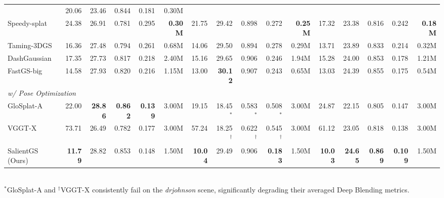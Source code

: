 \documentclass[sigconf]{acmart}
\begin{document}
\begin{table}[t!]
\begin{tabular} {l | rrrrr | rrrrr | rrrrr}
            & 20.06 & 23.46 & 0.844 & 0.181 & \cellcolor{tabsecond}0.30M \\
        Speedy-splat~\cite{hanson2025speedy}
            & 24.38 & 26.91 & 0.781 & 0.295 & \cellcolor{tabfirst} \bf 0.30M
            & 21.75 & 29.42 & 0.898 & 0.272 & \cellcolor{tabfirst} \bf 0.25M
            & 17.32 & 23.38 & 0.816 & 0.242 & \cellcolor{tabfirst} \bf 0.18M \\
        Taming-3DGS~\cite{mallick2024taming}
            & \cellcolor{tabthird}16.36 & 27.48 & 0.794 & 0.261 & \cellcolor{tabthird}0.68M
            & \cellcolor{tabthird}14.06 & 29.50 & 0.894 & 0.278 & \cellcolor{tabsecond}0.29M
            & \cellcolor{tabthird}13.71 & 23.89 & 0.833 & 0.214 & \cellcolor{tabthird}0.32M \\
        DashGaussian~\cite{chen2025dashgaussian}
            & 17.35 & 27.73 & 0.817 & 0.218 & 2.40M
            & 15.16 & 29.65 & \cellcolor{tabthird}0.906 & 0.246 & 1.94M
            & 15.28 & 24.00 & \cellcolor{tabthird}0.853 & 0.178 & 1.21M \\
        FastGS-big~\cite{ren2025fastgs}
            & \cellcolor{tabsecond}14.58 & 27.93 & 0.820 & 0.216 & 1.15M
            & \cellcolor{tabsecond}13.00 & \cellcolor{tabfirst} \bf 30.12 & \cellcolor{tabsecond}0.907 & 0.243 & 0.65M
            & \cellcolor{tabsecond}13.03 & \cellcolor{tabthird}24.39 & \cellcolor{tabsecond}0.855 & 0.175 & 0.54M \\
        \midrule
        \multicolumn{16}{l}{\textit{w/ Pose Optimization}} \\
        \midrule
        GloSplat-A~\cite{glosplat}
            & 22.00 & \cellcolor{tabfirst}\bf 28.86 & \cellcolor{tabfirst} \bf 0.862 & \cellcolor{tabfirst}\bf 0.139 & 3.00M
            & 19.15 & 18.45$^*$ & 0.583$^*$ & 0.508$^*$ & 3.00M
            & 24.87 & 22.15 & 0.805 & \cellcolor{tabthird}0.147 & 3.00M \\
        VGGT-X~\cite{wang2025vggt}
            & 73.71 & 26.49 & 0.782 & \cellcolor{tabthird}0.177 & 3.00M
            & 57.24 & 18.25$^\dagger$ & 0.622$^\dagger$ & 0.545$^\dagger$ & 3.00M
            & 61.12 & 23.05 & 0.818 & \cellcolor{tabsecond}0.138 & 3.00M \\
        SalientGS (Ours)
            & \cellcolor{tabfirst}\bf 11.79 & \cellcolor{tabsecond}28.82 & \cellcolor{tabsecond}0.853 & \cellcolor{tabsecond}0.148 & 1.50M
            & \cellcolor{tabfirst}\bf 10.04 & 29.49 & \cellcolor{tabthird}0.906 & \cellcolor{tabfirst}\bf 0.183 & 1.50M
            & \cellcolor{tabfirst}\bf 10.03 & \cellcolor{tabfirst}\bf 24.65 & \cellcolor{tabfirst}\bf 0.869 & \cellcolor{tabfirst}\bf 0.109 & 1.50M \\
        \bottomrule
    \end{tabular}
    \\[2pt]
    {\scriptsize $^*$GloSplat-A and $^\dagger$VGGT-X consistently fail on the \textit{drjohnson} scene, significantly degrading their averaged Deep Blending metrics.}
    \label{tab:main-result}
\end{table}
\end{document}
